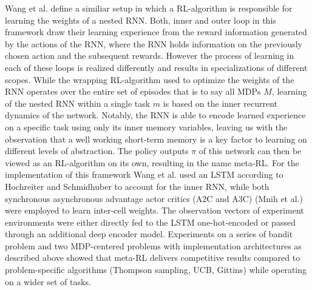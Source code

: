 \documentclass[letterpaper, 10 pt, conference]{ieeeconf}  %
\begin{document}
Wang et al.\cite{wangLearningReinforcementLearn2016} define a similiar setup in which a RL-algorithm is responsible for 
learning the weights of a nested RNN. Both, inner and outer loop 
in this framework draw their learning experience from the reward information generated by the actions of the RNN, where 
the RNN holds information on the previously chosen action and the subsequent rewards. However the process of learning
in each of these loops is realized differently and results in specializations of different scopes. While the wrapping RL-algorithm used to 
optimize the weights of the RNN operates over the entire set of episodes that is to say all MDPs $M$, learning of the nested RNN 
within a single task $m$ is based on the inner recurrent dynamics of the network. Notably, the RNN 
is able to encode learned experience on a specific task using only its inner memory variables, leaving us with the observation
that a well working short-term memory is a key factor to learning on different levels of abstraction. 
The policy outputs $\pi$ of this network can then
be viewed as an RL-algorithm on its own, resulting in the name meta-RL. For the implementation of this framework Wang et al.
\cite{wangLearningReinforcementLearn2016} 
used an LSTM according to Hochreiter and Schmidhuber \cite{hochreiterLongShortTermMemory1997} to account for the inner RNN, while both synchronous 
asynchronous advantage actor critics (A2C and A3C) (Mnih et al.) were employed to learn inter-cell weights.
The observation vectors of experiment environments
were either directly fed to the LSTM one-hot-encoded or passed through an additional deep encoder model\cite{wangLearningReinforcementLearn2016}. 
Experiments on a series of bandit problem and two
MDP-centered problems with implementation architectures as described above showed that meta-RL delivers 
competitive results compared to problem-specific algorithms (Thompson sampling, UCB, Gittins) while operating on a 
wider set of tasks. \newline
\end{document}
